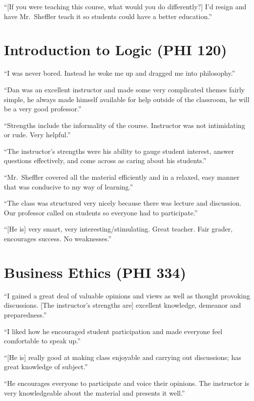\documentclass[12pt,oneside]{book}
\begin{document}
``{[}If you were teaching this course, what would you do differently?{]}
I'd resign and have Mr.~Sheffler teach it so students could have a
better education.''

\section{Introduction to Logic (PHI
120)}\label{introduction-to-logic-phi-120}

``I was never bored. Instead he woke me up and dragged me into
philosophy.''

``Dan was an excellent instructor and made some very complicated themes
fairly simple, he always made himself available for help outside of the
classroom, he will be a very good professor.''

``Strengths include the informality of the course. Instructor was not
intimidating or rude. Very helpful.''

``The instructor's strengths were his ability to gauge student interest,
answer questions effectively, and come across as caring about his
students.''

``Mr.~Sheffler covered all the material efficiently and in a relaxed,
easy manner that was conducive to my way of learning.''

``The class was structured very nicely because there was lecture and
discussion. Our professor called on students so everyone had to
participate.''

``{[}He is{]} very smart, very interesting/stimulating. Great teacher.
Fair grader, encourages success. No weaknesses.''

\section{Business Ethics (PHI 334)}\label{business-ethics-phi-334}

``I gained a great deal of valuable opinions and views as well as
thought provoking discussions. {[}The instructor's strengths are{]}
excellent knowledge, demeanor and preparedness.''

``I liked how he encouraged student participation and made everyone feel
comfortable to speak up.''

``{[}He is{]} really good at making class enjoyable and carrying out
discussions; has great knowledge of subject.''

``He encourages everyone to participate and voice their opinions. The
instructor is very knowledgeable about the material and presents it
well.''
\end{document}
